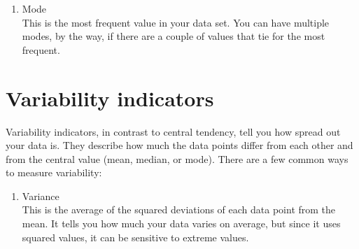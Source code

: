 \documentclass[
]{book}
\newenvironment{Shaded}{\begin{snugshade}}{\end{snugshade}}
\newcommand{\AttributeTok}[1]{\textcolor[rgb]{0.13,0.29,0.53}{#1}}
\newcommand{\CommentTok}[1]{\textcolor[rgb]{0.56,0.35,0.01}{\textit{#1}}}
\newcommand{\FunctionTok}[1]{\textcolor[rgb]{0.13,0.29,0.53}{\textbf{#1}}}
\newcommand{\NormalTok}[1]{#1}
\newcommand{\SpecialCharTok}[1]{\textcolor[rgb]{0.81,0.36,0.00}{\textbf{#1}}}
\newcommand{\StringTok}[1]{\textcolor[rgb]{0.31,0.60,0.02}{#1}}
\providecommand{\tightlist}{%
  \setlength{\itemsep}{0pt}\setlength{\parskip}{0pt}}
\begin{document}
\begin{Shaded}
\end{Shaded}

\begin{enumerate}
\def\labelenumi{\arabic{enumi}.}
\setcounter{enumi}{2}
\tightlist
\item
  Mode\\
  This is the most frequent value in your data set. You can have multiple modes, by the way, if there are a couple of values that tie for the most frequent.
\end{enumerate}

\begin{Shaded}
\end{Shaded}

\hypertarget{variability-indicators}{%
\section{Variability indicators}\label{variability-indicators}}

Variability indicators, in contrast to central tendency, tell you how spread out your data is. They describe how much the data points differ from each other and from the central value (mean, median, or mode). There are a few common ways to measure variability:

\begin{enumerate}
\def\labelenumi{\arabic{enumi}.}
\tightlist
\item
  Variance\\
  This is the average of the squared deviations of each data point from the mean. It tells you how much your data varies on average, but since it uses squared values, it can be sensitive to extreme values.
\end{enumerate}
\end{document}
